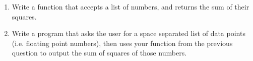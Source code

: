 \begin{enumerate}

	\item Write a function that accepts a list of numbers, and returns    the sum of their squares.
	\item Write a program that asks the user for a space separated list    of data points (i.e. floating point numbers), then uses your    function from the previous question to output the sum of squares of    those numbers.



\end{enumerate}    
